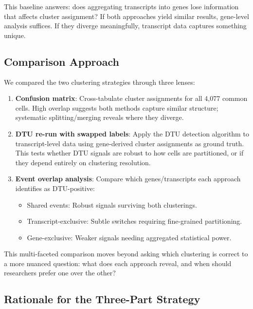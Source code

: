 This baseline answers: does aggregating transcripts into genes lose information that affects cluster assignment? If both approaches yield similar results, gene-level analysis suffices. If they diverge meaningfully, transcript data captures something unique.

\subsection*{Comparison Approach}

We compared the two clustering strategies through three lenses:

\begin{enumerate}
    \item \textbf{Confusion matrix}: Cross-tabulate cluster assignments for all 4,077 common cells. High overlap suggests both methods capture similar structure; systematic splitting/merging reveals where they diverge.
    \item \textbf{DTU re-run with swapped labels}: Apply the DTU detection algorithm to transcript-level data using gene-derived cluster assignments as ground truth. This tests whether DTU signals are robust to how cells are partitioned, or if they depend entirely on clustering resolution.
    \item \textbf{Event overlap analysis}: Compare which genes/transcripts each approach identifies as DTU-positive:
    \begin{itemize}
        \item Shared events: Robust signals surviving both clusterings.
        \item Transcript-exclusive: Subtle switches requiring fine-grained partitioning.
        \item Gene-exclusive: Weaker signals needing aggregated statistical power.
    \end{itemize}
\end{enumerate}

This multi-faceted comparison moves beyond asking which clustering is correct to a more nuanced question: what does each approach reveal, and when should researchers prefer one over the other?

\subsection*{Rationale for the Three-Part Strategy}

